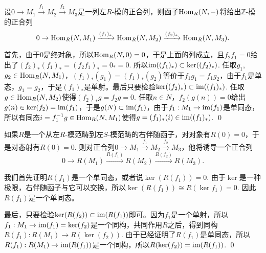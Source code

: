 
\pro 设$0\to M_1\xrightarrow{f_1} M_2\xrightarrow{f_2} M_3$是一列左$R$-模的正合列，则函子$\operatorname{Hom}_R(N,-)$将给出$\mathbb{Z}$-模的正合列
\[
	0\to \operatorname{Hom}_R(N,M_1)\xrightarrow{(f_1)_*} \operatorname{Hom}_R(N,M_2)\xrightarrow{(f_2)_*} \operatorname{Hom}_R(N,M_3).
\]

\proof
	首先，由于$0$是终对象，所以$\operatorname{Hom}_R(N,0)=0$，于是上面的列成立，且$f_2f_1=0$给出了$(f_2)_*(f_1)_*=(f_2f_1)_*=0_*=0$. 所以$\operatorname{im} ((f_1)_*)\subset \ker ((f_2)_*)$. 任取$g_1$, $g_2\in \operatorname{Hom}_R(N,M_1)$，$(f_1)_*(g_1)=(f_1)_*(g_2)$等价于$f_1g_1=f_1g_2$，由于$f_1$是单态，$g_1=g_2$，于是$(f_1)_*$是单射。最后只要检验$\ker ((f_2)_*)\subset \operatorname{im} ((f_1)_*)$. 任取$g\in \operatorname{Hom}_R(N,M_2)$使得$(f_2)_*g=f_2g=0$. 任取$n\in N$，$f_2(g(n))=0$给出$g(n)\in \ker(f_2)=\operatorname{im}(f_1)$，于是$g(N)\subset \operatorname{im}(f_1)$，由于$f_1:M_1\to \operatorname{im}(f_1)$是单同态，所以有同态$i=f_1^{-1}g\in \operatorname{Hom}_R(N,M_1)$使得$g=(f_1)_*(i)\in \operatorname{im} ((f_1)_*)$.
\qed

\pro 如果$R$是一个从左$R$-模范畴到左$S$-模范畴的右伴随函子，对对象有$R(0)=0$，于是对态射有$R(0)=0$. 则对正合列$0\to M_1\xrightarrow{f_1} M_2\xrightarrow{f_2} M_3$，他将诱导一个正合列
\[
	0\to R(M_1)\xrightarrow{R(f_1)} R(M_2)\xrightarrow{R(f_2)} R(M_3).
\]

\proof
	我们首先证明$R(f_1)$是一个单同态，或者说$\ker(R(f_1))=0$. 由于$\ker$是一种极限，右伴随函子与它可以交换，所以$\ker(R(f_1))\cong R(\ker f_1)=0$. 因此$R(f_1)$是一个单同态。

	最后，只要检验$\ker (R(f_2))\subset \operatorname{im} (R(f_1))$即可。因为$f_1$是一个单射，所以$f_1:M_1\to \operatorname{im} (f_1)=\ker(f_2)$是一个同构，共同作用$R$之后，得到同构$R(f_1):R(M_1)\to R(\ker(f_2))$. 由于已经证明了$R(f_1)$是单同态，所以$R(f_1):R(M_1)\to \operatorname{im} (R(f_1))$是一个同构，所以$R(\ker(f_2))=\operatorname{im} (R(f_1))$. 
\qed